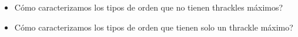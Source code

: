 \begin{itemize}
  \item Cómo caracterizamos los tipos de orden que no tienen thrackles máximos?
  \item Cómo caracterizamos los tipos de orden que tienen solo un thrackle
  máximo?
\end{itemize}
